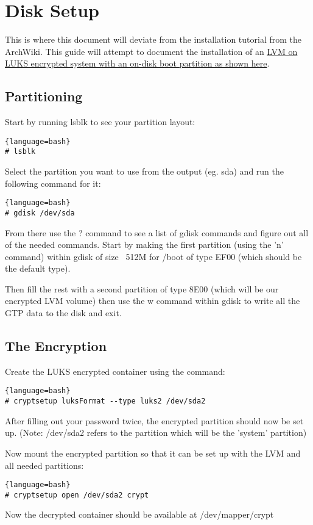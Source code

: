 
\section{Disk Setup}
This is where this document will deviate from the installation tutorial from the ArchWiki. This guide will attempt to document the installation of an  \href{https://wiki.archlinux.org/index.php/Dm-crypt/Encrypting_an_entire_system#LVM_on_LUKS}{LVM on LUKS encrypted system with an on-disk boot partition as shown here}.

\subsection{Partitioning}
Start by running lsblk to see your partition layout:
\begin{lstlisting}{language=bash}
# lsblk
\end{lstlisting}
Select the partition you want to use from the output (eg. sda) and run the following command for it:
\begin{lstlisting}{language=bash}
# gdisk /dev/sda
\end{lstlisting}
From there use the ? command to see a list of gdisk commands and figure out all of the needed commands.
Start by making the first partition (using the 'n' command) within gdisk of size ~512M for /boot of type EF00 (which should be the default type).

Then fill the rest with a second partition of type 8E00 (which will be our encrypted LVM volume) then use the w command within gdisk to write all the GTP data to the disk and exit.

\subsection{The Encryption}
Create the LUKS encrypted container using the command:
\begin{lstlisting}{language=bash}
# cryptsetup luksFormat --type luks2 /dev/sda2
\end{lstlisting}
After filling out your password twice, the encrypted partition should now be set up.
(Note: /dev/sda2 refers to the partition which will be the 'system' partition)

Now mount the encrypted partition so that it can be set up with the LVM and all needed partitions:
\begin{lstlisting}{language=bash}
# cryptsetup open /dev/sda2 crypt
\end{lstlisting}
Now the decrypted container should be available at /dev/mapper/crypt

